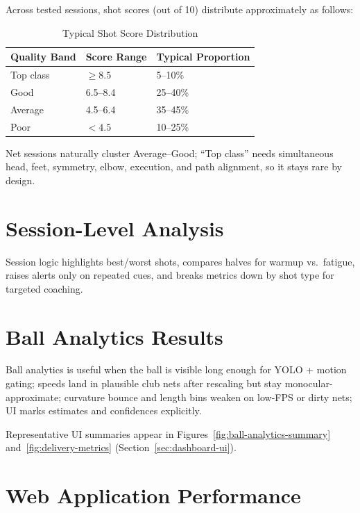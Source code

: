 \begin{justify}
\par Across tested sessions, shot scores (out of 10) distribute approximately as follows:

\begin{table}[ht]
\centering
\caption{Typical Shot Score Distribution}
\label{tab:scoredist}
\begin{tabular}{l l l}
 \hline
 \textbf{Quality Band} & \textbf{Score Range} & \textbf{Typical Proportion} \\
 \hline
 Top class & $\geq 8.5$ & 5--10\% \\
 Good & 6.5--8.4 & 25--40\% \\
 Average & 4.5--6.4 & 35--45\% \\
 Poor & $< 4.5$ & 10--25\% \\
 \hline
\end{tabular}
\end{table}

\par Net sessions naturally cluster Average--Good; ``Top class'' needs simultaneous head, feet, symmetry, elbow, execution, and path alignment, so it stays rare by design.

\section{Session-Level Analysis}

\par Session logic highlights best/worst shots, compares halves for warmup vs.\ fatigue, raises alerts only on repeated cues, and breaks metrics down by shot type for targeted coaching.

\section{Ball Analytics Results}
\label{sec:ball-analytics}

\par Ball analytics is useful when the ball is visible long enough for YOLO + motion gating; speeds land in plausible club nets after rescaling but stay monocular-approximate; curvature bounce and length bins weaken on low-FPS or dirty nets; UI marks estimates and confidences explicitly.

\par Representative UI summaries appear in Figures~\ref{fig:ball-analytics-summary} and~\ref{fig:delivery-metrics} (Section~\ref{sec:dashboard-ui}).

\section{Web Application Performance}


\end{justify}
